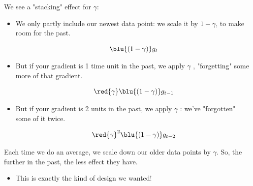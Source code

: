             \subsecdiv

            We see a "stacking" effect for $\gamma$: 
            
            \begin{itemize}
                \item We only partly include our newest data point: we scale it by $1-\gamma$, to make room for the past.

                \begin{equation}
                    \blu{(1-\gamma)} g_{t}
                \end{equation}
                
                \item But if your gradient is 1 time unit in the past, we apply $\gamma$ , "forgetting" some more of that gradient.

                \begin{equation}
                    \red{\gamma}\blu{(1-\gamma)} g_{t-1}
                \end{equation}

                \item But if your gradient is 2 units in the past, we apply $\gamma$ : we've "forgotten" some of it twice.

                \begin{equation}
                    \red{\gamma}^2\blu{(1-\gamma)} g_{t-2}
                \end{equation}
            \end{itemize}

            Each time we do an average, we scale down our older data points by $\gamma$. So, the further in the past, the less effect they have.

            \begin{itemize}
                \item This is exactly the kind of design we wanted!\\
            \end{itemize}

